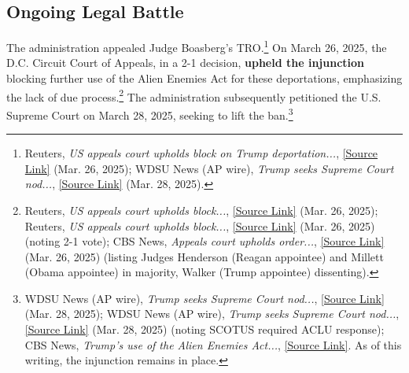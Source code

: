 \documentclass[11pt, letterpaper]{article}
\begin{document}
\subsection*{Ongoing Legal Battle}
The administration appealed Judge Boasberg's TRO.\footnote{Reuters, \emph{US appeals court upholds block on Trump deportation...}, \href{https://www.reuters.com/world/us/us-homeland-secretary-visit-el-salvador-prison-holding-deported-venezuelans-2025-03-26/\#:~:text=Venezuelan\%20immigrants\%20under\%20a\%20little,18th\%20century\%20law}{[Source Link]} (Mar. 26, 2025); WDSU News (AP wire), \emph{Trump seeks Supreme Court nod...}, \href{https://www.wdsu.com/article/trump-supreme-court-venezuelan-deportations/64321685\#:~:text=Enemies\%20Act\%20for\%20the\%20first,Tuesday\%20deadline\%20for\%20a\%20response}{[Source Link]} (Mar. 28, 2025).} On March 26, 2025, the D.C. Circuit Court of Appeals, in a 2-1 decision, \textbf{upheld the injunction} blocking further use of the Alien Enemies Act for these deportations, emphasizing the lack of due process.\footnote{Reuters, \emph{US appeals court upholds block...}, \href{https://www.reuters.com/world/us/us-homeland-secretary-visit-el-salvador-prison-holding-deported-venezuelans-2025-03-26/\#:~:text=WASHINGTON\%2C\%20March\%2026\%20\%28Reuters\%29\%20\%20,used\%2018th\%20century\%20law}{[Source Link]} (Mar. 26, 2025); Reuters, \emph{US appeals court upholds block...}, \href{https://www.reuters.com/world/us/us-homeland-secretary-visit-el-salvador-prison-holding-deported-venezuelans-2025-03-26/\#:~:text=A\%20three,dissenting}{[Source Link]} (Mar. 26, 2025) (noting 2-1 vote); CBS News, \emph{Appeals court upholds order...}, \href{https://www.cbsnews.com/news/appeals-court-stopping-deportations-alien-enemies-act/?intcid=CNI-00-10aaa3a\#:~:text=Judges\%20Karen\%20LeCraft\%20Henderson\%20and,favor\%20of\%20the\%20Justice\%20Department}{[Source Link]} (Mar. 26, 2025) (listing Judges Henderson (Reagan appointee) and Millett (Obama appointee) in majority, Walker (Trump appointee) dissenting).} The administration subsequently petitioned the U.S. Supreme Court on March 28, 2025, seeking to lift the ban.\footnote{WDSU News (AP wire), \emph{Trump seeks Supreme Court nod...}, \href{https://www.wdsu.com/article/trump-supreme-court-venezuelan-deportations/64321685\#:~:text=By\%20MARK\%20SHERMAN\%20Associated\%20Press}{[Source Link]} (Mar. 28, 2025); WDSU News (AP wire), \emph{Trump seeks Supreme Court nod...}, \href{https://www.wdsu.com/article/trump-supreme-court-venezuelan-deportations/64321685\#:~:text=the\%20American\%20Civil\%20Liberties\%20Union,his\%20allies\%20have\%20called\%20for}{[Source Link]} (Mar. 28, 2025) (noting SCOTUS required ACLU response); CBS News, \emph{Trump's use of the Alien Enemies Act...}, \href{https://www.cbsnews.com/news/trump-alien-enemies-act-of-1798-history/?intcid=CNR-01-0623\#:~:text=federal\%20appeals\%20court\%20\%20on,lift\%20the\%20lower\%20court\%20orders}{[Source Link]}. As of this writing, the injunction remains in place.}
\end{document}
